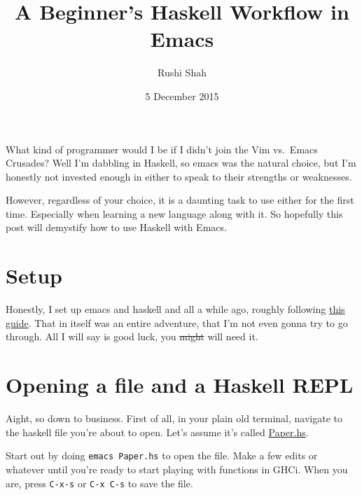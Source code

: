 \documentclass[12pt]{article}
\title{A Beginner's Haskell Workflow in Emacs}
\author{Rushi Shah}
\date{5 December 2015}
\begin{document}
  \maketitle

What kind of programmer would I be if I didn't join the Vim vs.~Emacs
Crusades? Well I'm dabbling in Haskell, so emacs was the natural choice,
but I'm honestly not invested enough in either to speak to their
strengths or weaknesses.

However, regardless of your choice, it is a daunting task to use either
for the first time. Especially when learning a new language along with
it. So hopefully this post will demystify how to use Haskell with Emacs.

\section{Setup}\label{setup}

Honestly, I set up emacs and haskell and all a while ago, roughly
following
\href{https://github.com/serras/emacs-haskell-tutorial/blob/master/tutorial.md}{this
guide}. That in itself was an entire adventure, that I'm not even gonna
try to go through. All I will say is good luck, you \sout{might} will
need it.

\section{Opening a file and a Haskell
REPL}\label{opening-a-file-and-a-haskell-repl}

Aight, so down to business. First of all, in your plain old terminal,
navigate to the haskell file you're about to open. Let's assume it's
called
\href{https://github.com/2016rshah/adventofcode/blob/master/day2/Paper.hs}{Paper.hs}.

Start out by doing \texttt{emacs\ Paper.hs} to open the file. Make a few
edits or whatever until you're ready to start playing with functions in
GHCi. When you are, press \texttt{C-x-s} or \texttt{C-x\ C-s} to save
the file.
\end{document}
